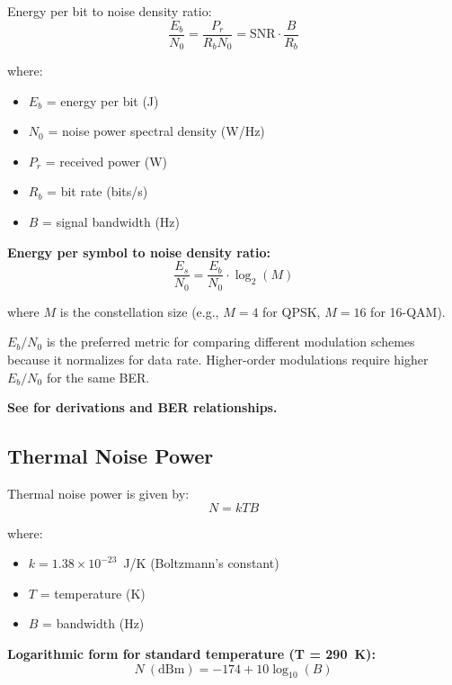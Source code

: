 Energy per bit to noise density ratio:
\begin{equation}
\label{eq:eb-n0}
\frac{E_b}{N_0} = \frac{P_r}{R_b N_0} = \text{SNR} \cdot \frac{B}{R_b}
\end{equation}

where:
\begin{itemize}
\item $E_b$ = energy per bit (J)
\item $N_0$ = noise power spectral density (W/Hz)
\item $P_r$ = received power (W)
\item $R_b$ = bit rate (bits/s)
\item $B$ = signal bandwidth (Hz)
\end{itemize}

\textbf{Energy per symbol to noise density ratio:}
\begin{equation}
\label{eq:es-n0}
\frac{E_s}{N_0} = \frac{E_b}{N_0} \cdot \log_2(M)
\end{equation}

where $M$ is the constellation size (e.g., $M=4$ for QPSK, $M=16$ for 16-QAM).

\begin{importantbox}
$E_b/N_0$ is the preferred metric for comparing different modulation schemes because it normalizes for data rate. Higher-order modulations require higher $E_b/N_0$ for the same BER.
\end{importantbox}

\textbf{See  for derivations and BER relationships.}

\subsection{Thermal Noise Power}
\label{subsec:thermal-noise}

Thermal noise power is given by:
\begin{equation}
\label{eq:thermal-noise}
N = kTB
\end{equation}

where:
\begin{itemize}
\item $k = 1.38 \times 10^{-23}$~J/K (Boltzmann's constant)
\item $T$ = temperature (K)
\item $B$ = bandwidth (Hz)
\end{itemize}

\textbf{Logarithmic form for standard temperature (T = 290~K):}
\begin{equation}
\label{eq:thermal-noise-dbm}
N\ (\text{dBm}) = -174 + 10\log_{10}(B)
\end{equation}

